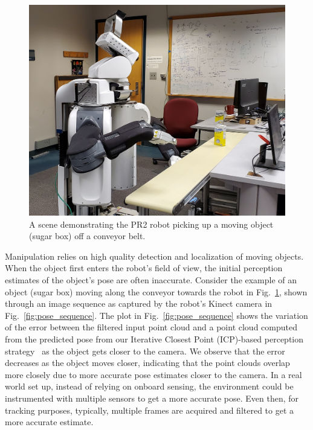 \documentclass[a4paper]{report}
\begin{document}
\begin{figure}[t]
    \centering
    \includegraphics[trim=0 50 0 100, clip, width=\columnwidth]{figs/cover_pic.jpg}
    \caption{
    \CaptionTextSize
    A scene demonstrating the PR2 robot picking up a moving object (sugar box) off a conveyor belt.}
    \label{fig:intro_pic}
\end{figure}

Manipulation relies on high quality detection and localization of moving objects. When the object first enters the robot's field of view, the initial perception estimates of the object's pose are often inaccurate. Consider the example of an object (sugar box) moving along the conveyor towards the robot in Fig.~\ref{fig:intro_pic}, shown through an image sequence as captured by the robot's Kinect camera in Fig.~\ref{fig:pose_sequence}. 
%
The plot in Fig.~\ref{fig:pose_sequence} shows the variation of the error between the filtered input point cloud and a point cloud computed from the predicted pose from our Iterative Closest Point (ICP)-based perception strategy~\cite{ISL19} as the object gets closer to the camera. We observe that the error decreases as the object moves closer, indicating that the point clouds overlap more closely due to more accurate pose estimates closer to the camera.
In a real world set up, instead of relying on onboard sensing, the environment could be instrumented with multiple sensors to get a more accurate pose. Even then, for tracking purposes, typically, multiple frames are acquired and filtered to get a more accurate estimate.
\end{document}
